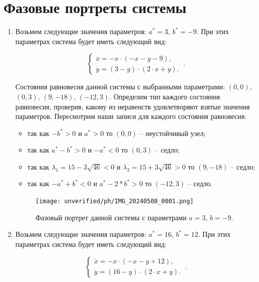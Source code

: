 \section{Фазовые портреты системы}
\begin{enumerate} 


\item

Возьмем следующие значения параметров:  $a^\ast = 3$, $b^\ast = -9$. При этих параметрах система будет иметь следующий вид: 

$$
\left \lbrace 
\begin{matrix} 
\dot{x} = -x \cdot (-x - y - 9), \\
\dot{y} = (3 - y) \cdot (2 \cdot x + y). \
\end{matrix} 
\right . .$$

Состояния равновесия данной системы с выбранными параметрами: $(0, 0)$, $(0, 3)$, $(9, -18)$, $(-12, 3)$. Определим тип каждого состояния равновесия, проверив, какому из неравенств удовлетворяют взятые значения параметров.  Пересмотрим наши записи для каждого состояния равновесия: 
\begin{itemize}
\item{ так как $-b^\ast > 0 $ и $a^\ast > 0 $ то $(0, 0)$ -- неустойчивый узел;}
\item{ так как $a^\ast - b^\ast > 0 $ и $-a^\ast  < 0 $ то $(0, 3)$ -- седло;}
\item{ так как ${\lambda_{1}} = 15 - 3 \sqrt{46}  < 0 $ и ${\lambda_{2}} = 15 + 3 \sqrt{46} > 0 $ то $(9, -18)$ -- седло;}
\item{ так как $-a^\ast + b^\ast  < 0 $ и $a^\ast - 2*b^\ast > 0 $ то $(-12, 3)$ -- седло.}
\end{itemize} 



\begin{figure}[!thb]
\texttt{[image: unverified/ph/IMG\_20240508\_0001.png]}
\centering
\caption{\label{fig:bifdiag2} Фазовый портрет данной системы с параметрами $a = 3$, $b = -9$.}
\end{figure}

\newpage
\item
Возьмем следующие значения параметров:  $a^\ast = 16$, $b^\ast = 12$. При этих параметрах система будет иметь следующий вид: 

$$
\left \lbrace 
\begin{matrix} 
\dot{x} = -x \cdot (-x - y + 12), \\
\dot{y} = (16 - y) \cdot (2 \cdot x + y). \
\end{matrix} 
\right . .$$


\end{enumerate}
